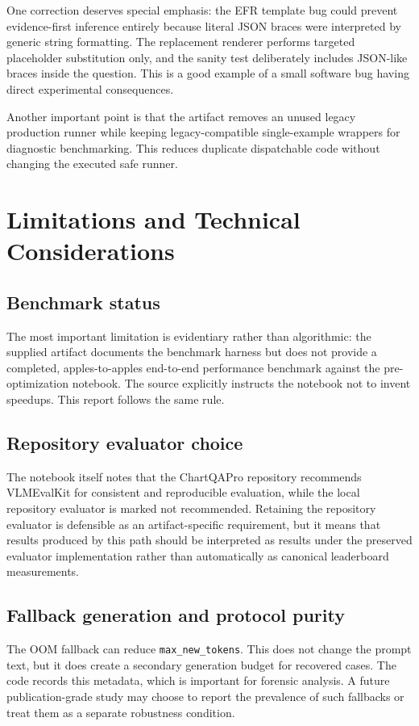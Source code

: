 \documentclass[11pt,a4paper]{article}
\newcommand{\code}[1]{\texttt{#1}}
\begin{document}
One correction deserves special emphasis: the EFR template bug could prevent evidence-first inference entirely because literal JSON braces were interpreted by generic string formatting. The replacement renderer performs targeted placeholder substitution only, and the sanity test deliberately includes JSON-like braces inside the question. This is a good example of a small software bug having direct experimental consequences.

Another important point is that the artifact removes an unused legacy production runner while keeping legacy-compatible single-example wrappers for diagnostic benchmarking. This reduces duplicate dispatchable code without changing the executed safe runner.

\section{Limitations and Technical Considerations}
\subsection{Benchmark status}
The most important limitation is evidentiary rather than algorithmic: the supplied artifact documents the benchmark harness but does not provide a completed, apples-to-apples end-to-end performance benchmark against the pre-optimization notebook. The source explicitly instructs the notebook not to invent speedups. This report follows the same rule.

\subsection{Repository evaluator choice}
The notebook itself notes that the ChartQAPro repository recommends VLMEvalKit for consistent and reproducible evaluation, while the local repository evaluator is marked not recommended. Retaining the repository evaluator is defensible as an artifact-specific requirement, but it means that results produced by this path should be interpreted as results under the preserved evaluator implementation rather than automatically as canonical leaderboard measurements.

\subsection{Fallback generation and protocol purity}
The OOM fallback can reduce \code{max\_new\_tokens}. This does not change the prompt text, but it does create a secondary generation budget for recovered cases. The code records this metadata, which is important for forensic analysis. A future publication-grade study may choose to report the prevalence of such fallbacks or treat them as a separate robustness condition.
\end{document}
